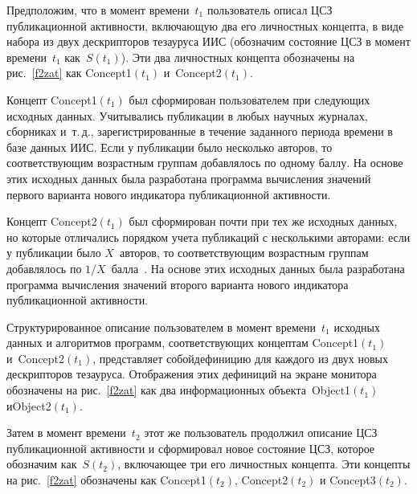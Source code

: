 \begin{multicols}{2}
   
   Предположим, что в момент времени~$t_1$ пользователь описал ЦСЗ публикационной 
активности, включающую два его личностных концепта, в виде набора из двух дескрипторов 
тезауруса ИИС (обозначим состояние ЦСЗ в момент времени~$t_1$ как~$S(t_1)$). Эти два 
личностных концепта обозначены на рис.~\ref{f2zat} как Concept1$(t_1)$ и~Concept2$(t_1)$.




   Концепт Concept1$(t_1)$ был сформирован пользователем при следующих исходных 
данных. Учитывались публикации в любых научных журналах, сборниках и~т.\,д., 
зарегистрированные в течение заданного периода времени в базе данных ИИС. Если у 
публикации было несколько авторов, то соответствующим возрастным группам добавлялось 
по одному баллу. На основе этих исходных данных была разработана программа вычисления 
значений первого варианта нового индикатора пуб\-ли\-ка\-ци\-он\-ной активности.
   
   Концепт Concept2$(t_1)$ был сформирован почти при тех же исходных данных, но 
которые отличались порядком учета публикаций с несколькими авторами: если у 
публикации было $X$~авторов, то соответствующим возрастным группам добавлялось по 
$1/X$~балла~\cite{7zat}. На основе этих исходных данных была разработана программа 
вычисления значений второго варианта нового индикатора пуб\-ли\-ка\-ци\-он\-ной активности.
   
   Структурированное описание пользователем в момент времени~$t_1$ исходных данных и 
алго\-рит\-мов программ, соответствующих концептам Concept1$(t_1)$ и~Concept2$(t_1)$, 
представляет собой\linebreak дефиницию для каждого из двух новых дескрипторов тезауруса. 
Отображения этих дефиниций на экране монитора обозначены на рис.~\ref{f2zat} как два 
информационных объекта~Object1$(t_1)$ и\linebreak Object2$(t_1)$.
{ %

}
   
   Затем в момент времени~$t_2$ этот же пользователь продолжил описание ЦСЗ 
публикационной активности и сформировал новое состояние ЦСЗ, которое обозначим 
как~$S(t_2)$, включающее три его личностных концепта. Эти концепты на рис.~\ref{f2zat}\linebreak 
обозначены как Concept1$(t_2)$, Concept2$(t_2)$ и Concept3$(t_2)$.
   

\end{multicols}
